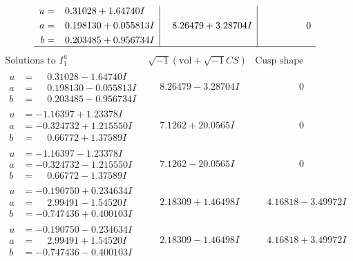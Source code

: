 \documentclass[1p]{elsarticle_modified}
\theoremstyle{definition}
\newcommand{\I}{\sqrt{-1}}
\begin{document}
$$\begin{array}{c|c|c}
\begin{aligned}
u &= \phantom{-}0.31028 + 1.64740 I \\
a &= \phantom{-}0.198130 + 0.055813 I \\
b &= \phantom{-}0.203485 + 0.956734 I\end{aligned}
 & \phantom{-}8.26479 + 3.28704 I & \phantom{-0.000000 } 0\\
 \hline 
 \end{array}$$\newpage$$\begin{array}{c|c|c}  
\text{Solutions to }I^u_{1}& \I (\text{vol} + \sqrt{-1}CS) & \text{Cusp shape}\\
 \hline 
\begin{aligned}
u &= \phantom{-}0.31028 - 1.64740 I \\
a &= \phantom{-}0.198130 - 0.055813 I \\
b &= \phantom{-}0.203485 - 0.956734 I\end{aligned}
 & \phantom{-}8.26479 - 3.28704 I & \phantom{-0.000000 } 0 \\ \hline\begin{aligned}
u &= -1.16397 + 1.23378 I \\
a &= -0.324732 + 1.215550 I \\
b &= \phantom{-}0.66772 + 1.37589 I\end{aligned}
 & \phantom{-}7.1262 + 20.0565 I & \phantom{-0.000000 } 0 \\ \hline\begin{aligned}
u &= -1.16397 - 1.23378 I \\
a &= -0.324732 - 1.215550 I \\
b &= \phantom{-}0.66772 - 1.37589 I\end{aligned}
 & \phantom{-}7.1262 - 20.0565 I & \phantom{-0.000000 } 0 \\ \hline\begin{aligned}
u &= -0.190750 + 0.234634 I \\
a &= \phantom{-}2.99491 - 1.54520 I \\
b &= -0.747436 + 0.400103 I\end{aligned}
 & \phantom{-}2.18309 + 1.46498 I & \phantom{-}4.16818 - 3.49972 I \\ \hline\begin{aligned}
u &= -0.190750 - 0.234634 I \\
a &= \phantom{-}2.99491 + 1.54520 I \\
b &= -0.747436 - 0.400103 I\end{aligned}
 & \phantom{-}2.18309 - 1.46498 I & \phantom{-}4.16818 + 3.49972 I \\ \hline\begin{aligned}

\end{aligned}
\end{array}$$
\end{document}
